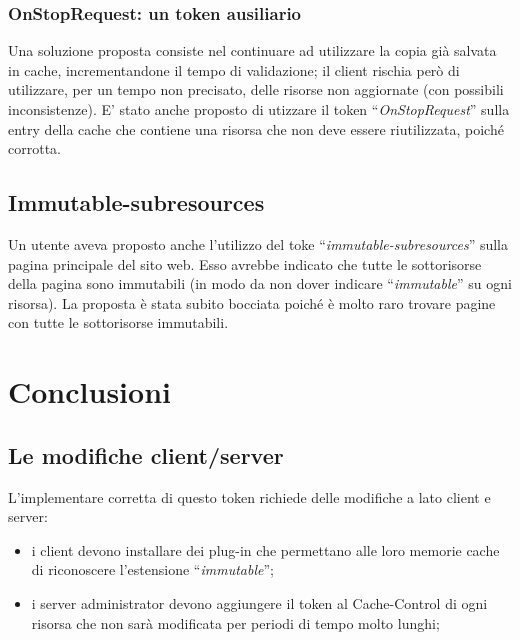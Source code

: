 \documentclass[a4paper,12pt]{report}
\begin{document}
\subsection{OnStopRequest: un token ausiliario}
Una soluzione proposta consiste nel continuare ad utilizzare la copia già salvata in cache, incrementandone il tempo di validazione; il client rischia però di utilizzare, per un tempo non precisato, delle risorse non aggiornate (con possibili inconsistenze).
E’ stato anche proposto di utizzare il token “{\itshape OnStopRequest}” sulla entry della cache che contiene una risorsa che non deve essere riutilizzata, poiché corrotta.

\section{Immutable-subresources}
Un utente aveva proposto anche l’utilizzo del toke “{\itshape immutable-subresources}” sulla pagina principale del sito web. Esso avrebbe indicato che tutte le sottorisorse della pagina sono immutabili (in modo da non dover indicare “{\itshape immutable}” su ogni risorsa). La proposta è stata subito bocciata poiché è molto raro trovare pagine con tutte le sottorisorse immutabili.



\chapter{Conclusioni}

\section{Le modifiche client/server}
L’implementare corretta di questo token richiede delle modifiche a lato client e server:
\begin{itemize}
\item i client devono installare dei plug-in che permettano alle loro memorie cache di riconoscere l’estensione “{\itshape immutable}”;
\item i server administrator devono aggiungere il token al Cache-Control di ogni risorsa che non sarà modificata per periodi di tempo molto lunghi;
\end{itemize}
\end{document}
